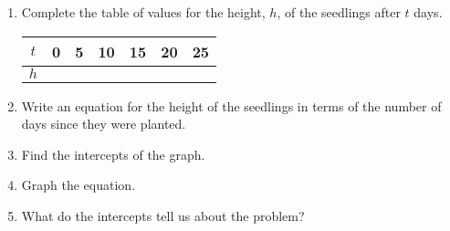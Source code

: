 \documentclass[12pt]{article}
\begin{document}
\begin{enumerate}
\item Complete the table of values for the height, $h$, of the seedlings after $t$ days.  

 
 \begin{table}[h!]
\begin{center}
\renewcommand{\arraystretch}{1.7}
\begin{tabular}{|c|c|c|c|c|c|c|}
\hline
$t$ &	\hspace*{.2in} 0 \hspace*{.2in} &	\hspace*{.2in} 5 \hspace*{.2in} &	\hspace*{.2in} 10 \hspace*{.2in} & \hspace*{.2in} 15 \hspace*{.2in} & \hspace*{.2in} 20 \hspace*{.2in} &  \hspace*{.2in} 25 \hspace*{.2in}\\
\hline
$h$ & & & & & & \\
\hline	
\end{tabular}
\end{center}
\end{table}	

\item Write an equation for the height of the seedlings in terms of the number of days since they were planted.
\vspace{1.1in}

\item Find the intercepts of the graph.
\vspace{1.4in}

\item Graph the equation.
\vspace{2.5in}

\vspace{.1in}


\item What do the intercepts tell us about the problem?
\vspace{2in}

\end{enumerate}
\end{document}
